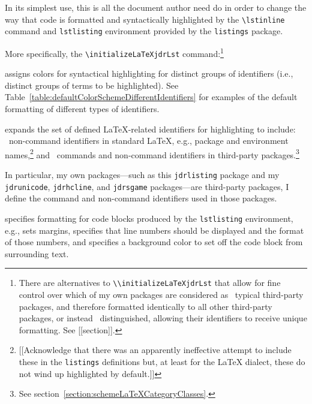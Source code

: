 \documentclass[12pt,table,final]{article}%
\begin{document}
In its simplest use, this is all the document author need do in order to change the way that code is formatted and syntactically highlighted by the \lstinline|\lstinline| command and \lstinline|lstlisting| environment provided by the \lstinline|listings| package.

More specifically, the \lstinline|\initializeLaTeXjdrLst| command:\footnote{There are alternatives to \lstinline|\\initializeLaTeXjdrLst| that allow for fine control over which of my own packages are considered as ~typical third-party packages, and therefore formatted identically to all other third-party packages, or instead ~distinguished, allowing their identifiers to receive unique formatting. See [[section]].}
\begin{jdr_itemize}
  \item assigns colors for syntactical highlighting for distinct groups of identifiers (i.e., distinct groups of terms to be highlighted). See Table~\ref{table:defaultColorSchemeDifferentIdentifiers} for examples of the default formatting of different types of identifiers.
  \item expands the set of defined \LaTeX{}-related identifiers for highlighting to include: ~non-command identifiers in standard \LaTeX{}, e.g., package and environment names,\footnote{[[Acknowledge that there was an apparently ineffective attempt to include these in the \lstinline|listings| definitions but, at least for the \LaTeX{} dialect, these do not wind up highlighted by default.]]} and ~commands and non-command identifiers in third-party packages.\footnote{See section~\ref{section:schemeLaTeXCategoryClasses}.}
  \begin{jdr_itemize}
    \item In particular, my own packages---such as this \lstinline|jdrlisting| package and my \lstinline|jdrunicode|, \lstinline|jdrhcline|, and \lstinline|jdrsgame| packages---are third-party packages, I define the command and non-command identifiers used in those packages.
\end{jdr_itemize}
  \item specifies formatting for code blocks produced by the \lstinline|lstlisting| environment, e.g., sets margins, specifies that line numbers should be displayed and the format of those numbers, and specifies a background color to set off the code block from surrounding text.
\end{jdr_itemize}
\end{document}
